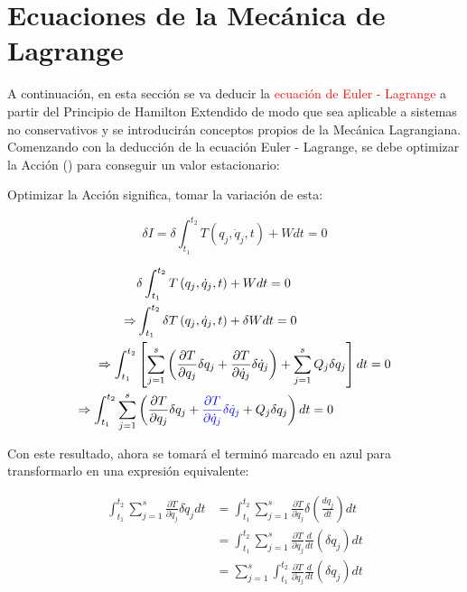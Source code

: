 \documentclass[/home/hernan/Documentos/Apuntes_mecanica_teorica/main.tex]{subfiles}
\begin{document}
    \section{Ecuaciones de la Mecánica de Lagrange}

    A continuación, en esta sección se va deducir la \textcolor{red}{ecuación de Euler - Lagrange}  a partir del Principio de Hamilton Extendido de modo que sea aplicable a sistemas no conservativos y se introducirán conceptos propios de la Mecánica Lagrangiana. \\ 

    Comenzando con la deducción de la ecuación Euler - Lagrange, se debe optimizar la Acción () para conseguir un valor estacionario:

    Optimizar la Acción significa, tomar la variación de esta:
    
    \begin{equation*}
        \delta I = \delta \int_{t_1}^{t_2} T\left(q_{j}, \dot{q}_{j}, t\right) + W dt = 0 
    \end{equation*}

    \begin{align*}
        & \delta \int_{t_1}^{t_2} T\left(q_{j}, \dot{q}_{j}, t\right) + W dt = 0 \\ 
        \Rightarrow & \int_{t_1}^{t_2} \delta T\left(q_{j}, \dot{q}_{j}, t\right) + \delta  W dt = 0 \\ 
        \Rightarrow  \int_{t_1}^{t_2}  & \left[  \sum_{j=1}^{s} \left( \frac{\partial T}{\partial q_{j}}   \delta q_{j} +\frac{\partial T}{\partial \dot{q}_{j}} \delta \dot{q}_{j}  \right) + \sum_{j=1}^{s} Q_{j} \delta q_{j}  \right] dt = 0 \\ 
        \Rightarrow \int_{t_1}^{t_2} \sum_{j=1}^{s} & \left(\frac{\partial T}{\partial q_{j}} \delta q_{j} + \textcolor{blue}{\frac{\partial T}{\partial \dot{q}_{j}} \delta \dot{q}_{j}}   + Q_{j} \delta q_{j} \right) dt = 0 \\ 
    \end{align*}

    Con este resultado, ahora se tomará el terminó marcado en azul para transformarlo en una expresión equivalente:

    \begin{align*}
        \int_{t_1}^{t_2} \sum_{j=1}^{s} \frac{\partial T}{\partial \dot{q}_{j}} \delta \dot{q}_{j} dt & = \int_{t_1}^{t_2} \sum_{j=1}^{s} \frac{\partial T}{\partial \dot{q}_{j}} \delta \left(\frac{d q_{j}}{d t}\right) dt \\ 
        & = \int_{t_1}^{t_2} \sum_{j=1}^{s} \frac{\partial T}{\partial \dot{q}_{j}} \frac{d}{d t} \left(\delta  q_{j}\right) dt \\ 
        & = \sum_{j=1}^{s} \int_{t_1}^{t_2} \frac{\partial T}{\partial \dot{q}_{j}} \frac{d}{d t} \left(\delta  q_{j}\right) dt \\ 
    \end{align*}
\end{document}
